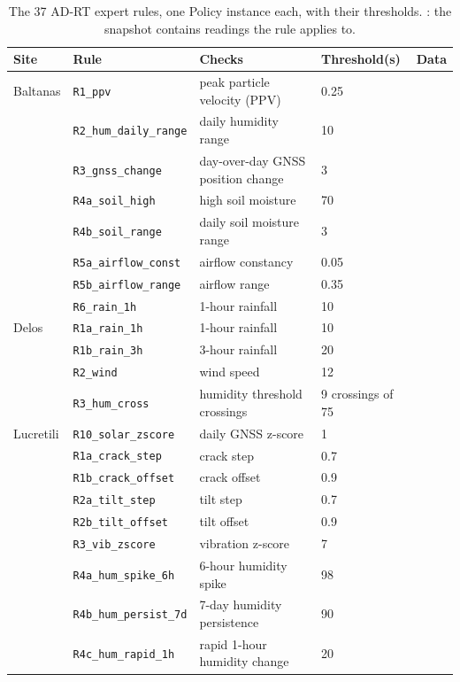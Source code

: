 \begin{table}[t]
\centering\small
\caption{The 37 AD-RT expert rules, one Policy instance each, with their thresholds. \checkmark: the snapshot contains readings the rule applies to.}
\label{tab:rules}
\begin{tabular}{llp{4.6cm}lc}
\toprule
Site & Rule & Checks & Threshold(s) & Data \\
\midrule
Baltanas & \texttt{R1\_ppv} & peak particle velocity (PPV) & 0.25 &  \\
 & \texttt{R2\_hum\_daily\_range} & daily humidity range & 10 &  \\
 & \texttt{R3\_gnss\_change} & day-over-day GNSS position change & 3 &  \\
 & \texttt{R4a\_soil\_high} & high soil moisture & 70 &  \\
 & \texttt{R4b\_soil\_range} & daily soil moisture range & 3 &  \\
 & \texttt{R5a\_airflow\_const} & airflow constancy & 0.05 &  \\
 & \texttt{R5b\_airflow\_range} & airflow range & 0.35 &  \\
 & \texttt{R6\_rain\_1h} & 1-hour rainfall & 10 &  \\
\midrule
Delos & \texttt{R1a\_rain\_1h} & 1-hour rainfall & 10 &  \\
 & \texttt{R1b\_rain\_3h} & 3-hour rainfall & 20 &  \\
 & \texttt{R2\_wind} & wind speed & 12 &  \\
 & \texttt{R3\_hum\_cross} & humidity threshold crossings & 9 crossings of 75 &  \\
\midrule
Lucretili & \texttt{R10\_solar\_zscore} & daily GNSS z-score & 1 &  \\
 & \texttt{R1a\_crack\_step} & crack step & 0.7 &  \\
 & \texttt{R1b\_crack\_offset} & crack offset & 0.9 &  \\
 & \texttt{R2a\_tilt\_step} & tilt step & 0.7 &  \\
 & \texttt{R2b\_tilt\_offset} & tilt offset & 0.9 &  \\
 & \texttt{R3\_vib\_zscore} & vibration z-score & 7 &  \\
 & \texttt{R4a\_hum\_spike\_6h} & 6-hour humidity spike & 98 &  \\
 & \texttt{R4b\_hum\_persist\_7d} & 7-day humidity persistence & 90 &  \\
 & \texttt{R4c\_hum\_rapid\_1h} & rapid 1-hour humidity change & 20 &  \\

\end{tabular}
\end{table}
